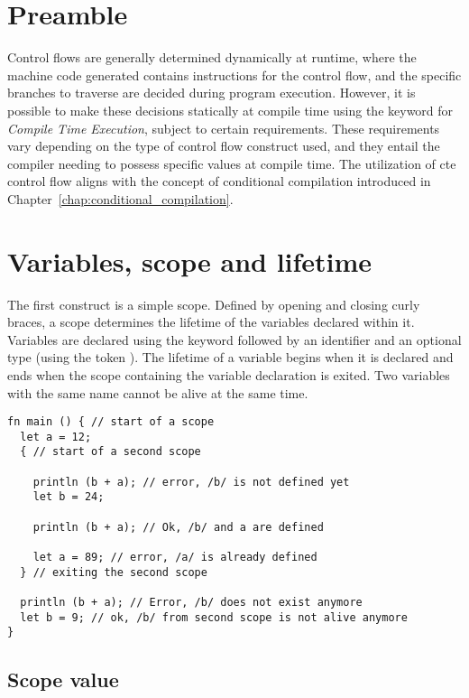 \section{Preamble}

Control flows are generally determined dynamically at runtime, where the machine
code generated contains instructions for the control flow, and the specific
branches to traverse are decided during program execution. However, it is
possible to make these decisions statically at compile time using the keyword
 for \textit{Compile Time Execution}, subject to certain
requirements. These requirements vary depending on the type of control flow
construct used, and they entail the compiler needing to possess specific values
at compile time. The utilization of cte control flow aligns with the concept of
conditional compilation introduced in
Chapter~\ref{chap:conditional_compilation}.


\section{Variables, scope and lifetime}
\label{sec:variable_lifetime}

The first construct is a simple scope. Defined by opening and closing curly
braces, a scope determines the lifetime of the variables declared within it.
Variables are declared using the keyword  followed by an identifier
and an optional type (using the token \token{:}). The lifetime of a variable
begins when it is declared and ends when the scope containing the variable
declaration is exited. Two variables with the same name cannot be alive at the
same time.

\begin{lstlisting}[style=coloredverbatim]
fn main () { // start of a scope
  let a = 12;
  { // start of a second scope

    println (b + a); // error, /b/ is not defined yet
    let b = 24;

    println (b + a); // Ok, /b/ and a are defined

    let a = 89; // error, /a/ is already defined
  } // exiting the second scope

  println (b + a); // Error, /b/ does not exist anymore
  let b = 9; // ok, /b/ from second scope is not alive anymore
}
\end{lstlisting}

\subsection{Scope value}


